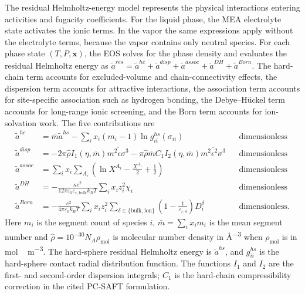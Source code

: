 The residual Helmholtz-energy model represents the physical interactions entering activities and fugacity coefficients.
For the liquid phase, the MEA electrolyte state activates the ionic terms.
In the vapor the same expressions apply without the electrolyte terms, because the vapor contains only neutral species.
For each phase state $(T,P,\mathbf{x})$, the EOS solves for the phase density and evaluates the residual Helmholtz energy as $\tilde{a}^{res}=\tilde{a}^{hc}+\tilde{a}^{disp}+\tilde{a}^{assoc}+\tilde{a}^{DH}+\tilde{a}^{Born}$.
The hard-chain term accounts for excluded-volume and chain-connectivity effects, the dispersion term accounts for attractive interactions, the association term accounts for site-specific association such as hydrogen bonding, the Debye--H\"uckel term accounts for long-range ionic screening, and the Born term accounts for ion-solvation work.
The five contributions are
\begin{align}
\tilde{a}^{hc}
&= \bar{m}\tilde{a}^{hs}
-\sum_i x_i(m_i-1)\ln g_{ii}^{hs}(\sigma_{ii})
&& \text{dimensionless}\label{eq:epcsaft-hc}\\
\tilde{a}^{disp}
&= -2\pi\widehat\rho I_1(\eta,\bar{m})\overline{m^2\epsilon\sigma^3}
-\pi\widehat\rho\bar{m}C_1I_2(\eta,\bar{m})\overline{m^2\epsilon^2\sigma^3}
&& \text{dimensionless}\label{eq:epcsaft-disp}\\
\tilde{a}^{assoc}
&= \sum_i x_i\sum_{A_i}
\left(\ln X^{A_i}-\frac{X^{A_i}}{2}+\frac{1}{2}\right)
&& \text{dimensionless}\label{eq:epcsaft-assoc}\\
\tilde{a}^{DH}
&=-\frac{\kappa e^{2}}{12\pi\varepsilon_{0}\varepsilon_{r,\mathrm{bulk}}k_{B}T}
\sum_i x_i z_i^2 \chi_i
&& \text{dimensionless}\label{eq:epcsaft-dh}\\
\tilde{a}^{Born}
&=
-\frac{e^2}{4\pi\varepsilon_0 k_B T}
\sum_i x_i z_i^2
\sum_{\delta\in\{\mathrm{bulk},\mathrm{ion}\}}
\left(1-\frac{1}{\varepsilon_{r,\delta}}\right)
D_i^{\delta}
&& \text{dimensionless}\label{eq:epcsaft-born}.
\end{align}
Here $m_i$ is the segment count of species $i$, $\bar{m}=\sum_i x_i m_i$ is the mean segment number and $\widehat\rho=10^{-30}N_A\rho_{\mathrm{mol}}$ is molecular number density in \unit{\angstrom^{-3}} when $\rho_{\mathrm{mol}}$ is in \unit{mol\,m^{-3}}.
The hard-sphere residual Helmholtz energy is $\tilde a^{hs}$, and $g_{ii}^{hs}$ is the hard-sphere contact radial distribution function.
The functions $I_1$ and $I_2$ are the first- and second-order dispersion integrals; $C_1$ is the hard-chain compressibility correction in the cited PC-SAFT formulation.
